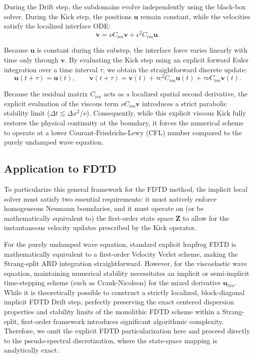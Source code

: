 \documentclass{Configuration_Files/PoliMi3i_thesis}
\begin{document}
During the Drift step, the subdomains evolve independently using the black-box solver. During the Kick step, the positions $\mathbf u$ remain constant, while the velocities satisfy the localized interface ODE:
\begin{equation*}
\mathbf{\dot v}
=
\nu C_{\mathrm{res}}\mathbf v
+
c^2C_{\mathrm{res}}\mathbf u.
\end{equation*}

Because $\mathbf u$ is constant during this substep, the interface force varies linearly with time only through $\mathbf v$. By evaluating the Kick step using an explicit forward Euler integration over a time interval $\tau$, we obtain the straightforward discrete update:
\begin{equation}
\mathbf u(t+\tau)=\mathbf u(t),
\qquad
\mathbf v(t+\tau)
=
\mathbf v(t)
+
\tau c^2C_{\mathrm{res}}\mathbf u(t)
+
\tau \nu C_{\mathrm{res}}\mathbf v(t).
\label{eq:kick_flow}
\end{equation}

Because the residual matrix $C_{\mathrm{res}}$ acts as a localized spatial second derivative, the explicit evaluation of the viscous term $\nu C_{\mathrm{res}}\mathbf v$ introduces a strict parabolic stability limit ($\Delta t \lesssim \Delta x^2 / \nu$). Consequently, while this explicit viscous Kick fully restores the physical continuity at the boundary, it forces the numerical scheme to operate at a lower Courant-Friedrichs-Lewy (CFL) number compared to the purely undamped wave equation.

\subsection{Application to FDTD}

To particularize this general framework for the FDTD method, the implicit local solver must satisfy two essential requirements: it must natively enforce homogeneous Neumann boundaries, and it must operate on (or be mathematically equivalent to) the first-order state space $\mathbf Z$ to allow for the instantaneous velocity updates prescribed by the Kick operator.

For the purely undamped wave equation, standard explicit leapfrog FDTD is mathematically equivalent to a first-order Velocity Verlet scheme, making the Strang-split ARD integration straightforward. However, for the viscoelastic wave equation, maintaining numerical stability necessitates an implicit or semi-implicit time-stepping scheme (such as Crank-Nicolson) for the mixed derivative $\mathbf u_{txx}$. While it is theoretically possible to construct a strictly localized, block-diagonal implicit FDTD Drift step, perfectly preserving the exact centered dispersion properties and stability limits of the monolithic FDTD scheme within a Strang-split, first-order framework introduces significant algorithmic complexity. Therefore, we omit the explicit FDTD particularization here and proceed directly to the pseudo-spectral discretization, where the state-space mapping is analytically exact.
\end{document}
